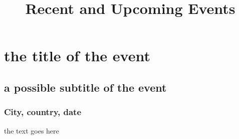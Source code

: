 


\title{Recent and Upcoming Events}


\maketitle

\section{the title of the event}
\subsection{a possible subtitle of the event}  
\subsubsection{City, country, date}

the text goes here



\address{Your Name\\
  Your organization\\
  \url{your homepage}\\
  }







